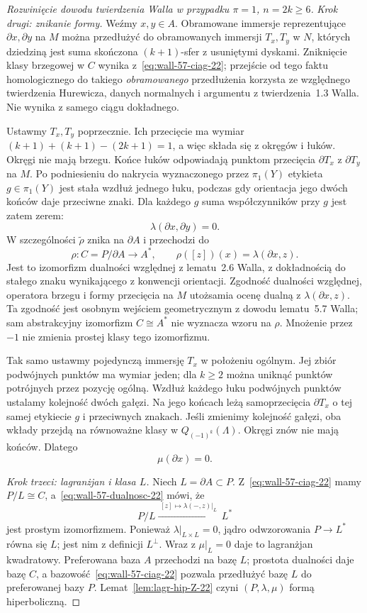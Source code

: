 \begin{proof}[Rozwinięcie dowodu twierdzenia Walla w przypadku
 $\pi=1$, $n=2k\geq6$]
\emph{Krok drugi: znikanie formy.}
Weźmy $x,y\in A$. Obramowane immersje
reprezentujące $\partial x,\partial y$
na $M$ można przedłużyć do obramowanych
immersji $T_x,T_y$ w $N$, których dziedziną
jest suma skończona $(k+1)$-sfer z usuniętymi
dyskami. Zniknięcie klasy brzegowej w $C$
wynika z~\eqref{eq:wall-57-ciag-22};
przejście od tego faktu homologicznego do
takiego \emph{obramowanego} przedłużenia
korzysta ze względnego twierdzenia Hurewicza,
danych normalnych i argumentu z twierdzenia~1.3
Walla. Nie wynika z samego ciągu dokładnego.

Ustawmy $T_x,T_y$ poprzecznie. Ich przecięcie
ma wymiar $(k+1)+(k+1)-(2k+1)=1$,
a więc składa się z okręgów i łuków.
Okręgi nie mają brzegu. Końce łuków
odpowiadają punktom przecięcia
$\partial T_x$ z $\partial T_y$ na $M$.
Po podniesieniu do nakrycia wyznaczonego
przez $\pi_1(Y)$ etykieta $g\in\pi_1(Y)$
jest stała wzdłuż jednego łuku, podczas
gdy orientacja jego dwóch końców daje
przeciwne znaki. Dla każdego $g$ suma
współczynników przy $g$ jest zatem zerem:
\[
 \lambda(\partial x,\partial y)=0.
\]
W szczególności $\widetilde\rho$ znika
na $\partial A$ i przechodzi do
\begin{equation}\label{eq:wall-57-dualnosc-22}
 \rho:C=P/\partial A\longrightarrow A^*,
 \qquad \rho([z])(x)=\lambda(\partial x,z).
\end{equation}
Jest to izomorfizm dualności względnej
z lematu~2.6 Walla, z dokładnością do
stałego znaku wynikającego z konwencji
orientacji. Zgodność dualności względnej,
operatora brzegu i formy przecięcia na $M$
utożsamia ocenę dualną z $\lambda(\partial x,z)$.
Ta zgodność jest osobnym wejściem
geometrycznym z dowodu lematu~5.7 Walla;
sam abstrakcyjny izomorfizm $C\cong A^*$
nie wyznacza wzoru na $\rho$.
Mnożenie przez $-1$ nie zmienia prostej
klasy tego izomorfizmu.

Tak samo ustawmy pojedynczą immersję
$T_x$ w położeniu ogólnym. Jej zbiór
podwójnych punktów ma wymiar jeden;
dla $k\geq2$ można uniknąć punktów
potrójnych przez pozycję ogólną.
Wzdłuż każdego łuku podwójnych punktów
ustalamy kolejność dwóch gałęzi.
Na jego końcach leżą samoprzecięcia
$\partial T_x$ o tej samej etykiecie
$g$ i przeciwnych znakach. Jeśli
zmienimy kolejność gałęzi, oba wkłady
przejdą na równoważne klasy w
$Q_{(-1)^k}(\Lambda)$.
Okręgi znów nie mają końców. Dlatego
\[
 \mu(\partial x)=0.
\]

\emph{Krok trzeci: lagranżjan i klasa $L$.}
Niech $L=\partial A\subset P$.
Z~\eqref{eq:wall-57-ciag-22} mamy $P/L\cong C$,
a~\eqref{eq:wall-57-dualnosc-22} mówi, że
\[
 P/L\xrightarrow{\;[z]\mapsto
           \lambda(-,z)|_L\;}L^*
\]
jest prostym izomorfizmem. Ponieważ
$\lambda|_{L\times L}=0$, jądro odwzorowania
$P\to L^*$ równa się $L$; jest nim
z definicji $L^\perp$. Wraz z
$\mu|_L=0$ daje to lagranżjan kwadratowy.
Preferowana baza $A$ przechodzi na bazę
$L$; prostota dualności daje bazę $C$,
a bazowość~\eqref{eq:wall-57-ciag-22}
pozwala przedłużyć bazę $L$ do
preferowanej bazy $P$.
Lemat~\ref{lem:lagr-hip-Z-22} czyni
$(P,\lambda,\mu)$ formą hiperboliczną.


\end{proof}
